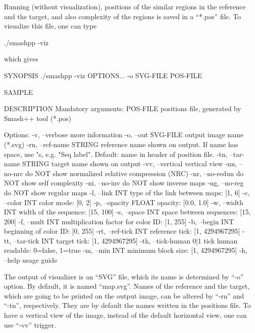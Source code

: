 Running \smashpp (without visualization), positions of the similar regions in the reference and the target, and also complexity of the regions is saved in a ``*.pos'' file. To visualize this file, one can type
\begin{code}[style=bash]
./smashpp -viz
\end{code}
which gives
\begin{code}[style=bash]
SYNOPSIS
  ./smashpp -viz  OPTIONS...  -o SVG-FILE  POS-FILE

SAMPLE

DESCRIPTION
  Mandatory arguments:
  POS-FILE                 positions file, generated by
                           Smash++ tool (*.pos)

  Options:
  -v,  --verbose           more information
  -o,  --out SVG-FILE      output image name (*.svg)
  -rn, --ref-name STRING   reference name shown on output. If name
                           has space, use "s, e.g. "Seq label".
                           Default: name in header of position file.
  -tn, --tar-name STRING   target name shown on output
  -vv, --vertical          vertical view
  -nn, --no-nrc            do NOT show normalized
                           relative compression (NRC)
  -nr, --no-redun          do NOT show self complexity
  -ni, --no-inv            do NOT show inverse maps
  -ng, --no-reg            do NOT show regular maps
  -l,  --link     INT      type of the link between maps: [1, 6]
  -c,  --color    INT      color mode: [0, 2]
  -p,  --opacity  FLOAT    opacity: [0.0, 1.0]
  -w,  --width    INT      width of the sequence: [15, 100]
  -s,  --space    INT      space between sequences: [15, 200]
  -f,  --mult     INT      multiplication factor for
                           color ID: [1, 255]
  -b,  --begin    INT      beginning of color ID: [0, 255]
  -rt, --ref-tick INT      reference tick: [1, 4294967295]
  -tt, --tar-tick INT      target tick: [1, 4294967295]
  -th, --tick-human 0|1    tick human readable: 0=false, 1=true
  -m,  --min      INT      minimum block size: [1, 4294967295]
  -h,  --help              usage guide
\end{code}

The output of \smashpp visualizer is an ``SVG'' file, which its name is determined by ``-o'' option. By default, it is named ``map.svg''. Names of the reference and the target, which are going to be printed on the output image, can be altered by ``-rn'' and ``-tn'', respectively. They are by default the names written in the positions file. To have a vertical view of the image, instead of the default horizontal view, one can use ``-vv'' trigger.

